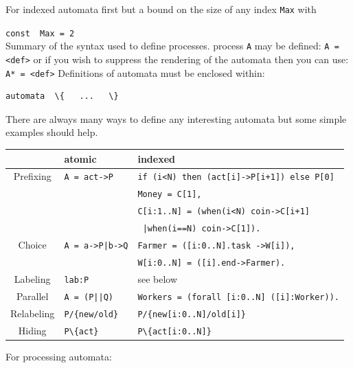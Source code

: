 \documentclass[]{article}
\begin{document}
\vspace{2ex}\noindent For indexed automata first but a bound on the size of any index \verb$Max$ with

\noindent\verb$const  Max = 2$ \\

\noindent Summary of the syntax used to define processes. process \verb|A| may be defined: \verb|A = <def>| or if you wish to suppress the rendering of the  automata then you can use: \verb|A* = <def>|  Definitions of  automata must be enclosed within:

\begin{verbatim}automata  \{   ...   \}\end{verbatim}
There are always many ways to define any interesting  automata  but some simple examples should help.

\vspace{2ex}\begin{tabular}{|c|l|l|} \hline
& atomic & indexed \\ \hline
Prefixing & \verb$A = act->P$ &  \verb$if (i<N) then (act[i]->P[i+1]) else P[0]$ \\ \hline
  & &  \verb$Money = C[1], $ \\
  & & \verb$C[i:1..N] = (when(i<N) coin->C[i+1]$ \\ 
       &   & \hspace{1.7cm} \verb$ |when(i==N) coin->C[1]).$ \\ \hline
Choice  &  \verb$A = a->P|b->Q$  &\verb$Farmer = ([i:0..N].task ->W[i]),$ \\ 
    &   &\hspace{0.7cm}\verb$W[i:0..N] = ([i].end->Farmer).$ \\ \hline
Labeling & \verb$lab:P$ &  see below \\ \hline
Parallel &  \verb$A = (P||Q)$ & \verb$Workers = (forall [i:0..N] ([i]:Worker)).$ \\ \hline
Relabeling & \verb$P/{new/old}$ &  \verb$P/{new[i:0..N]/old[i]}$ \\ \hline
Hiding & \verb$P\{act}$ & \verb$P\{act[i:0..N]}$ \\ \hline %
\end{tabular}

\vspace{2ex}\noindent For processing automata:
\end{document}
